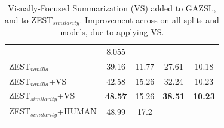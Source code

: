\documentclass[11pt,a4paper]{article}
\begin{document}
\begin{table}[t]
{\begin{tabular}{l|cc|cc}
                & 8.055
                 \\
            ZEST$_{vanilla}$                                                                 & 39.16                            & 11.77                             & 27.61                            & 10.18                             \\
                
                 
  ZEST$_{vanilla}$+VS                             & {42.58}                                  & {15.26}                                 & {32.24}      & {10.23}        \\
ZEST$_{similarity}$+VS                             & \textbf{48.57}                                  & {15.26}                                 & \textbf{38.51}      & \textbf{10.23}        \\

ZEST$_{similarity}$+HUMAN                          & 48.99                                & 17.2                                           & -                    & -                     \\ 
\Xhline{6\arrayrulewidth}
\end{tabular}
}
    \caption{Visually-Focused Summarization (VS) added to GAZSL, and to ZEST$_{similarity}$. Improvement across on all splits and models, due to applying VS. }%
    \label{table:summarization}%
\end{table}





\begin{table}[t]
\centering
    \caption{Zest model with different Similarity methods }%
    \label{table:similarity}%
\end{table}
\end{document}

